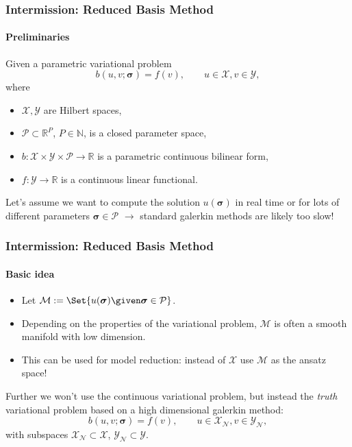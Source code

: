 \begin{frame}[t]
    \frametitle{Intermission: Reduced Basis Method}
    \framesubtitle{Preliminaries}

    Given a parametric variational problem
    \begin{equation}
        b(u, v; \bm \sigma) = f(v), \qquad u \in \mathcal X, v \in \mathcal Y,
    \end{equation}
    where
    \begin{itemize}
        \item $\mathcal X, \mathcal Y$ are Hilbert spaces,
        \item $\mathcal P \subset \mathbb{R}^{P}$, $P \in \mathbb{N}$, is a closed parameter space,
        \item $b \colon \mathcal X \times \mathcal Y \times \mathcal P \to \mathbb{R}$ is a parametric continuous bilinear form,
        \item $f \colon \mathcal Y \to \mathbb{R}$ is a continuous linear functional.
    \end{itemize}

    Let's assume we want to compute the solution $u(\bm \sigma)$ in real time or for lots of different parameters $\bm \sigma \in \mathcal P$
    $\rightarrow$ standard galerkin methods are likely too slow!
\end{frame}

\begin{frame}[t]
    \frametitle{Intermission: Reduced Basis Method}
    \framesubtitle{Basic idea}

    \begin{itemize}
        \item Let $\mathcal M := \Set{ u(\bm \sigma) \given \bm \sigma \in \mathcal P }$.
        \item Depending on the properties of the variational problem, $\mathcal M$ is often a smooth manifold with low dimension.
        \item {} This can be used for model reduction: instead of $\mathcal X$ use $\mathcal M$ as the ansatz space!
    \end{itemize}

    \vfill

    Further we won't use the continuous variational problem, but instead the \emph{truth} variational problem based on a high dimensional galerkin method:
    \begin{equation}
        b(u, v; \bm \sigma) = f(v), \qquad u \in \mathcal X_{\mathcal N}, v \in \mathcal Y_{\mathcal N},
    \end{equation}
    with subspaces $\mathcal X_{\mathcal N} \subset \mathcal X$, $\mathcal Y_{\mathcal N} \subset \mathcal Y$.
\end{frame}


